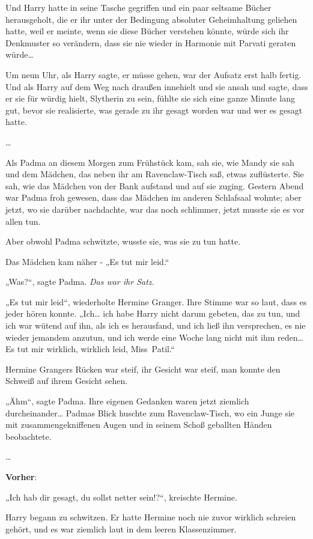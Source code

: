 {Und Harry hatte in seine Tasche gegriffen und ein paar seltsame Bücher herausgeholt, die er ihr unter der Bedingung absoluter Geheimhaltung geliehen hatte, weil er meinte, wenn sie diese Bücher verstehen könnte, würde sich ihr Denkmuster so verändern, dass sie nie wieder in Harmonie mit Parvati geraten würde…

Um neun Uhr, als Harry sagte, er müsse gehen, war der Aufsatz erst halb fertig. Und als Harry auf dem Weg nach draußen innehielt und sie ansah und sagte, dass er sie für würdig hielt, Slytherin zu sein, fühlte sie sich eine ganze Minute lang gut, bevor sie realisierte, was gerade zu ihr gesagt worden war und wer es gesagt hatte.

…

Als Padma an diesem Morgen zum Frühstück kam, sah sie, wie Mandy sie sah und dem Mädchen, das neben ihr am Ravenclaw-Tisch saß, etwas zuflüsterte. Sie sah, wie das Mädchen von der Bank aufstand und auf sie zuging. Gestern Abend war Padma froh gewesen, dass das Mädchen im anderen Schlafsaal wohnte; aber jetzt, wo sie darüber nachdachte, war das noch schlimmer, jetzt musste sie es vor allen tun.

Aber obwohl Padma schwitzte, wusste sie, was sie zu tun hatte.

Das Mädchen kam näher - „Es tut mir leid.“

„Was?“, sagte Padma. \emph{Das war ihr Satz.}

„Es tut mir leid“, wiederholte Hermine Granger. Ihre Stimme war so laut, dass es jeder hören konnte. „Ich… ich habe Harry nicht darum gebeten, das zu tun, und ich war wütend auf ihn, als ich es herausfand, und ich ließ ihn versprechen, es nie wieder jemandem anzutun, und ich werde eine Woche lang nicht mit ihm reden… Es tut mir wirklich, wirklich leid, Miss~Patil.“

Hermine Grangers Rücken war steif, ihr Gesicht war steif, man konnte den Schweiß auf ihrem Gesicht sehen.

„Ähm“, sagte Padma. Ihre eigenen Gedanken waren jetzt ziemlich durcheinander… Padmas Blick huschte zum Ravenclaw-Tisch, wo ein Junge sie mit zusammengekniffenen Augen und in seinem Schoß geballten Händen beobachtete.

…

\textbf{Vorher}:

„Ich hab dir gesagt, du sollst netter sein!?“, kreischte Hermine.

Harry begann zu schwitzen. Er hatte Hermine noch nie zuvor wirklich schreien gehört, und es war ziemlich laut in dem leeren Klassenzimmer.

}
